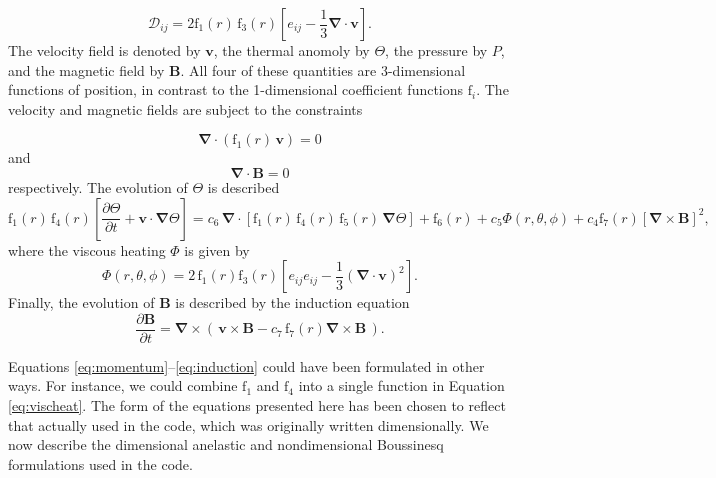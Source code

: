 \documentclass[10pt, letterpaper]{article}
\newcommand{\ff}{\mathrm{f}}
\begin{document}
\begin{equation}
\mathcal{D}_{ij} = 2\ff_1(r)\,\ff_3(r)\left[e_{ij}-\frac{1}{3}\boldsymbol{\nabla}\cdot\boldsymbol{v}\right].
\end{equation}
The velocity field is denoted by $\boldsymbol{v}$, the thermal anomoly by $\Theta$, the pressure by $P$, and the magnetic field by $\boldsymbol{B}$.  All four of these quantities are 3-dimensional functions of position, in contrast to the 1-dimensional coefficient functions $\ff_i$.  The velocity and magnetic fields are subject to the constraints

\begin{equation}
\boldsymbol{\nabla}\cdot\left(\ff_1(r)\,\boldsymbol{v}\right)=0
\end{equation}
and
\begin{equation}
\boldsymbol{\nabla}\cdot\boldsymbol{B}=0
\end{equation}
respectively.   The evolution of $\Theta$ is described
\begin{equation}
\ff_1(r)\,\ff_4(r)\left[\frac{\partial \Theta}{\partial t} +\boldsymbol{v}\cdot\boldsymbol{\nabla}\Theta \right] =
                                             c_6\,\boldsymbol{\nabla}\cdot\left[\ff_1(r)\,\ff_4(r)\,\ff_5(r)\,\boldsymbol{\nabla}\Theta \right] %
                                             +\ff_6(r)   %
                                             +c_5\Phi(r,\theta,\phi)
                                             +c_4\ff_7(r)\left[\boldsymbol{\nabla}\times\boldsymbol{B}\right]^2,  %
\end{equation}
where the viscous heating $\Phi$ is given by
\begin{equation}
\label{eq:vischeat}
\Phi(r,\theta,\phi) = 2\,\ff_1(r)\ff_3(r)\left[e_{ij}e_{ij}-\frac{1}{3}\left(\boldsymbol{\nabla}\cdot\boldsymbol{v}\right)^2\right].
\end{equation}
Finally, the evolution of $\boldsymbol{B}$ is described by the induction equation
\begin{equation}
\label{eq:induction}
\frac{\partial \boldsymbol{B}}{\partial t} = \boldsymbol{\nabla}\times\left(\,\boldsymbol{v}\times\boldsymbol{B}-c_7\,\ff_7(r)\boldsymbol{\nabla}\times\boldsymbol{B}\,\right).
\end{equation}

Equations \ref{eq:momentum}--\ref{eq:induction} could have been formulated in other ways.  For instance, we could combine $\ff_1$ and $\ff_4$ into a single function in Equation \ref{eq:vischeat}.  The form of the equations presented here has been chosen to reflect that actually used in the code, which was originally written dimensionally.  We now describe the dimensional anelastic and nondimensional Boussinesq formulations used in the code.
\end{document}
